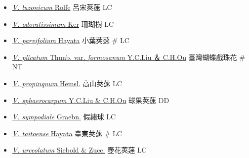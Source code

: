 \begin{itemize}
\begin{itemize}
        \item[] \href{http://www.theplantlist.org/tpl1.1/search?q=Viburnum+luzonicum}{\textit{V. luzonicum} Rolfe}   呂宋莢蒾   LC
        \item[] \href{http://www.theplantlist.org/tpl1.1/search?q=Viburnum+odoratissimum}{\textit{V. odoratissimum} Ker}   珊瑚樹   LC
        \item[] \href{http://www.theplantlist.org/tpl1.1/search?q=Viburnum+parvifolium}{\textit{V. parvifolium} Hayata}   小葉莢蒾  \# LC
        \item[] \href{http://www.theplantlist.org/tpl1.1/search?q=Viburnum+plicatum+var.+formosanum}{\textit{V. plicatum} Thunb. var. \textit{formosanum} Y.C.Liu ＆ C.H.Ou}   臺灣蝴蝶戲珠花  \# NT
        \item[] \href{http://www.theplantlist.org/tpl1.1/search?q=Viburnum+propinquum}{\textit{V. propinquum} Hemsl.}   高山莢蒾   LC
        \item[] \href{http://www.theplantlist.org/tpl1.1/search?q=Viburnum+sphaerocarpum}{\textit{V. sphaerocarpum} Y.C.Liu \& C.H.Ou}   球果莢蒾   DD
        \item[] \href{http://www.theplantlist.org/tpl1.1/search?q=Viburnum+sympodiale}{\textit{V. sympodiale} Graebn.}   假繡球   LC
        \item[] \href{http://www.theplantlist.org/tpl1.1/search?q=Viburnum+taitoense}{\textit{V. taitoense} Hayata}   臺東莢蒾  \# LC
        \item[] \href{http://www.theplantlist.org/tpl1.1/search?q=Viburnum+urceolatum}{\textit{V. urceolatum} Siebold \& Zucc.}   壺花莢蒾   LC
  \end{itemize}
  \end{itemize}

